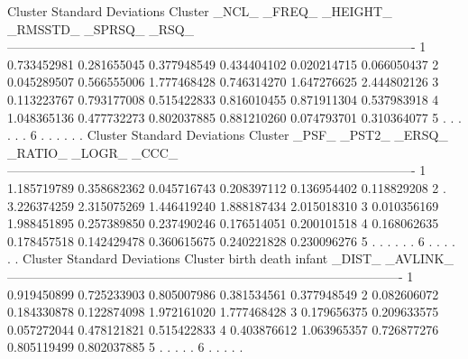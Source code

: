 \documentclass{article}
\begin{document}
\begin{Woutput}
                                   Cluster Standard Deviations
Cluster          _NCL_         _FREQ_       _HEIGHT_       _RMSSTD_        _SPRSQ_          _RSQ_
-------------------------------------------------------------------------------------------------
   1       0.733452981    0.281655045    0.377948549    0.434404102    0.020214715    0.066050437
   2       0.045289507    0.566555006    1.777468428    0.746314270    1.647276625    2.444802126
   3       0.113223767    0.793177008    0.515422833    0.816010455    0.871911304    0.537983918
   4       1.048365136    0.477732273    0.802037885    0.881210260    0.074793701    0.310364077
   5        .              .              .              .              .              .
   6        .              .              .              .              .              .
                                   Cluster Standard Deviations
Cluster          _PSF_         _PST2_         _ERSQ_        _RATIO_         _LOGR_          _CCC_
-------------------------------------------------------------------------------------------------
   1       1.185719789    0.358682362    0.045716743    0.208397112    0.136954402    0.118829208
   2        .             3.226374259    2.315075269    1.446419240    1.888187434    2.015018310
   3       0.010356169    1.988451895    0.257389850    0.237490246    0.176514051    0.200101518
   4       0.168062635    0.178457518    0.142429478    0.360615675    0.240221828    0.230096276
   5        .              .              .              .              .              .
   6        .              .              .              .              .              .
                                 Cluster Standard Deviations
Cluster          birth             death            infant            _DIST_          _AVLINK_
----------------------------------------------------------------------------------------------
   1       0.919450899       0.725233903       0.805007986       0.381534561       0.377948549
   2       0.082606072       0.184330878       0.122874098       1.972161020       1.777468428
   3       0.179656375       0.209633575       0.057272044       0.478121821       0.515422833
   4       0.403876612       1.063965357       0.726877276       0.805119499       0.802037885
   5        .                 .                 .                 .                 .
   6        .                 .                 .                 .                 .


\end{Woutput}
\end{document}
